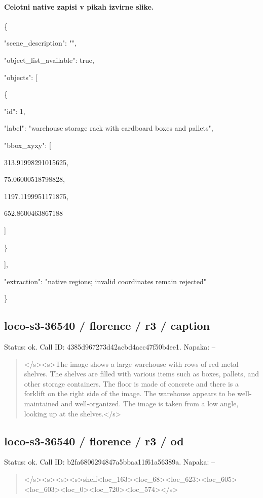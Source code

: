 \documentclass[10pt,a4paper]{article}
\begin{document}
\paragraph{Celotni native zapisi v pikah izvirne slike.}
\{\par
  "scene\_description":\allowbreak{} "",\allowbreak{}\par
  "object\_list\_available":\allowbreak{} true,\allowbreak{}\par
  "objects":\allowbreak{} [\par
    \{\par
      "id":\allowbreak{} 1,\allowbreak{}\par
      "label":\allowbreak{} "warehouse storage rack with cardboard boxes and pallets",\allowbreak{}\par
      "bbox\_xyxy":\allowbreak{} [\par
        313.91998291015625,\allowbreak{}\par
        75.06000518798828,\allowbreak{}\par
        1197.1199951171875,\allowbreak{}\par
        652.8600463867188\par
      ]\par
    \}\par
  ],\allowbreak{}\par
  "extraction":\allowbreak{} "native regions; invalid coordinates remain rejected"\par
\}
\subsection*{loco-s3-36540 / florence / r3 / caption}
Status: ok. Call ID: 4385d967273d42acbd4acc47f50b4ee1. Napaka: --
\begin{quote}\footnotesize
</s>\allowbreak{}<s>\allowbreak{}The image shows a large warehouse with rows of red metal shelves. The shelves are filled with various items such as boxes,\allowbreak{} pallets,\allowbreak{} and other storage containers. The floor is made of concrete and there is a forklift on the right side of the image. The warehouse appears to be well-maintained and well-organized. The image is taken from a low angle,\allowbreak{} looking up at the shelves.</s>\allowbreak{}
\end{quote}
\subsection*{loco-s3-36540 / florence / r3 / od}
Status: ok. Call ID: b2fa6806294847a5bbaa11f61a56389a. Napaka: --
\begin{quote}\footnotesize
</s>\allowbreak{}<s>\allowbreak{}<s>\allowbreak{}<s>\allowbreak{}shelf<loc\_163>\allowbreak{}<loc\_\allowbreak{}68>\allowbreak{}<loc\_623>\allowbreak{}<loc\_605>\allowbreak{}<loc\_603>\allowbreak{}<l\allowbreak{}oc\_0>\allowbreak{}<loc\_720>\allowbreak{}<loc\_574>\allowbreak{}</s>\allowbreak{}
\end{quote}
\end{document}
